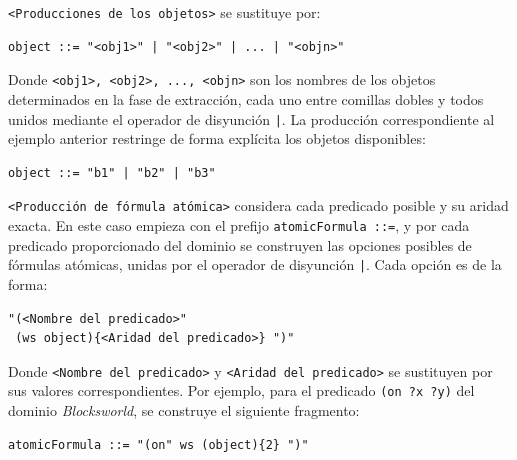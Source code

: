 \texttt{<Producciones de los objetos>} se sustituye por: 
\begin{tcolorbox}[colback=blue!5!white, colframe=blue!75!black, title=Fragmento \texttt{<Objetos>} no tipado con \textit{DAPS}, fonttitle=\bfseries, breakable]
\small
\begin{verbatim}
object ::= "<obj1>" | "<obj2>" | ... | "<objn>"
\end{verbatim}
\end{tcolorbox}

Donde \texttt{<obj1>, <obj2>, ..., <objn>} son los nombres de los objetos determinados en la fase de extracción, cada uno entre comillas dobles y todos unidos mediante el operador de disyunción \texttt{|}. La producción correspondiente al ejemplo anterior restringe de forma explícita los objetos disponibles:

\begin{tcolorbox}[colback=white, colframe=gray, title=Ejemplo de producciones de los objetos no tipados con \textit{DAPS}, fonttitle=\bfseries, breakable]
\small
\begin{verbatim}
object ::= "b1" | "b2" | "b3"
\end{verbatim}
\end{tcolorbox}

\texttt{<Producción de fórmula atómica>} considera cada predicado posible y su aridad exacta.  En este caso empieza con el prefijo \texttt{atomicFormula ::=}, y por cada predicado proporcionado del dominio se construyen las opciones posibles de fórmulas atómicas, unidas por el operador de disyunción \texttt{|}. Cada opción es de la forma:
\begin{tcolorbox}[colback=blue!5!white, colframe=blue!75!black, title=Producción de fórmula atómica en dominios no tipados con \textit{DAPS}, fonttitle=\bfseries, breakable]
\small
\begin{verbatim}
"(<Nombre del predicado>"
 (ws object){<Aridad del predicado>} ")"
\end{verbatim}
\end{tcolorbox}

Donde \texttt{<Nombre del predicado>} y \texttt{<Aridad del predicado>} se sustituyen por sus valores correspondientes. Por ejemplo, para el predicado \texttt{(on ?x ?y)} del dominio \textit{Blocksworld}, se construye el siguiente fragmento:

\begin{tcolorbox}[colback=white, colframe=gray, title=Ejemplo de producción de fórmula atómica con \textit{DAPS} (no tipado), fonttitle=\bfseries, breakable]
\small
\begin{verbatim}
atomicFormula ::= "(on" ws (object){2} ")"
\end{verbatim}
\end{tcolorbox}


